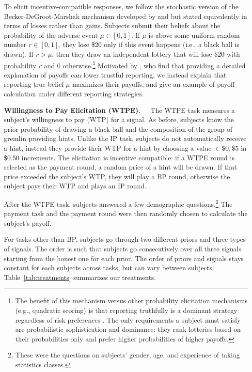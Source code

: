 \documentclass[12pt,a4paper]{article}
\begin{document}
To elicit incentive-compatible responses, we follow the stochastic version of the Becker-DeGroot-Marshak mechanism developed by \citet{grether_testing_1992} and \citet{holt_update_2009} but stated equivalently in terms of losses rather than gains.
Subjects submit their beliefs about the probability of the adverse event $\mu \in [0,1]$. If $\mu$ is above some uniform random number $r\in[0,1]$, they lose \$20 only if this event happens (i.e., a black ball is drawn). If $r > \mu$, then they draw an independent lottery that will lose \$20 with probability $r$ and 0 otherwise.\footnote{The benefit of this mechanism versus other probability elicitation mechanisms (e.g., quadratic scoring) is that reporting truthfully is a dominant strategy regardless of risk preferences \citep{karni_mechanism_2009-1}. The only requirements a subject must satisfy are probabilistic sophistication and dominance: they rank lotteries based on their probabilities only and prefer higher probabilities of higher payoffs.} Motivated by \citet{danz_belief_2020}, who find that providing a detailed explanation of payoffs can lower trustful reporting, we instead explain that reporting true belief $\mu$ maximizes their payoffs, and give an example of payoff calculation under different reporting strategies.

\bigskip
\noindent\textbf{Willingness to Pay Elicitation (WTPE)}.\ \ \ The WTPE task measures a subject's willingness to pay (WTP) for a signal. As before, subjects know the prior probability of drawing a black ball and the composition of the group of gremlin providing hints.  Unlike the IP task, subjects do not automatically receive a hint, instead they provide their WTP for a hint by choosing a value $\in{\$0,\$5}$ in \$0.50 increments. The elicitation is incentive compatible: if a WTPE round is selected as the payment round, a random price of a hint will be drawn. If that price exceeded the subject's WTP, they will play a BP round, otherwise the subject pays their WTP and plays an IP round.  

\vspace{10pt} 

After the WTPE task, subjects answered a few demographic questions.\footnote{These were the questions on subjects' gender, age, and experience of taking statistics classes.} The payment task and the payment round were then randomly chosen to calculate the subject's payoff. 

For tasks other than BP, subjects go through two different priors and three types of signals. The order is such that subjects go consecutively over all three signals starting from the honest one for each prior. The order of priors and signals stays constant for each subjects across tasks, but can vary between subjects. Table~\ref{tab:treatments} summarizes our treatments.
\end{document}
